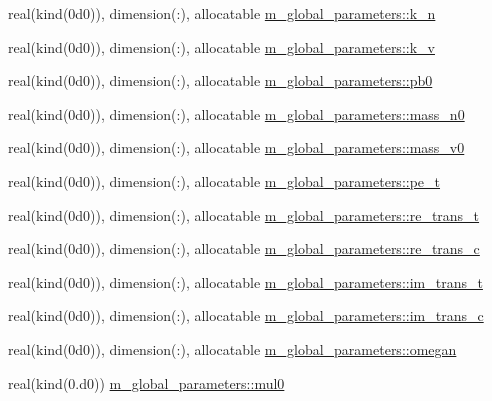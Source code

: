 \begin{Indent}
\begin{DoxyCompactItemize}
\item 
real(kind(0d0)), dimension(\+:), allocatable \hyperlink{namespacem__global__parameters_a555eda1318a218d37d1bdd8f4d57eaf2}{m\+\_\+global\+\_\+parameters\+::k\+\_\+n}
\item 
real(kind(0d0)), dimension(\+:), allocatable \hyperlink{namespacem__global__parameters_a1943ea5a5127e94a197afae57be95758}{m\+\_\+global\+\_\+parameters\+::k\+\_\+v}
\item 
real(kind(0d0)), dimension(\+:), allocatable \hyperlink{namespacem__global__parameters_a1097b95561b65a9035e5f9218de577f9}{m\+\_\+global\+\_\+parameters\+::pb0}
\item 
real(kind(0d0)), dimension(\+:), allocatable \hyperlink{namespacem__global__parameters_ae3701f74c9487c9e56c2a11fb6a52e40}{m\+\_\+global\+\_\+parameters\+::mass\+\_\+n0}
\item 
real(kind(0d0)), dimension(\+:), allocatable \hyperlink{namespacem__global__parameters_a6a06981be6cdab78452a106009022aa4}{m\+\_\+global\+\_\+parameters\+::mass\+\_\+v0}
\item 
real(kind(0d0)), dimension(\+:), allocatable \hyperlink{namespacem__global__parameters_a8a75928178eef1550c6a0389ff12b44a}{m\+\_\+global\+\_\+parameters\+::pe\+\_\+t}
\item 
real(kind(0d0)), dimension(\+:), allocatable \hyperlink{namespacem__global__parameters_ae0e61a10cd5b33db394052fbefee2681}{m\+\_\+global\+\_\+parameters\+::re\+\_\+trans\+\_\+t}
\item 
real(kind(0d0)), dimension(\+:), allocatable \hyperlink{namespacem__global__parameters_a666c8f5f6663ab81f55c2298e642a3a9}{m\+\_\+global\+\_\+parameters\+::re\+\_\+trans\+\_\+c}
\item 
real(kind(0d0)), dimension(\+:), allocatable \hyperlink{namespacem__global__parameters_a62b213889b2dc5da7d81e7fa636231f6}{m\+\_\+global\+\_\+parameters\+::im\+\_\+trans\+\_\+t}
\item 
real(kind(0d0)), dimension(\+:), allocatable \hyperlink{namespacem__global__parameters_aa93addd83f0134aaaf319ca2b743233c}{m\+\_\+global\+\_\+parameters\+::im\+\_\+trans\+\_\+c}
\item 
real(kind(0d0)), dimension(\+:), allocatable \hyperlink{namespacem__global__parameters_ae152b49c742928bc52f6da61dd805693}{m\+\_\+global\+\_\+parameters\+::omegan}
\item 
real(kind(0.d0)) \hyperlink{namespacem__global__parameters_ad7bef3ef71a8dfe1ce24000cff0eff8d}{m\+\_\+global\+\_\+parameters\+::mul0}
\item 

\end{DoxyCompactItemize}
\end{Indent}
